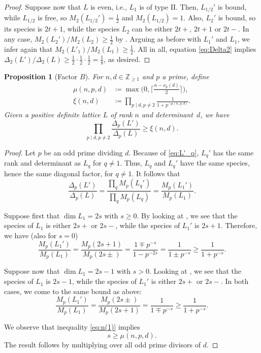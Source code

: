 \documentclass[a4paper]{amsart}
\theoremstyle{definition}
\theoremstyle{plain}
\newtheorem{proposition}[definition]{Proposition}
\newcommand{\IZ}{\mathbb{Z}}
\newcommand{\II}{\mathrm{II}}
\begin{document}
\begin{proof}
    Suppose now that \(L\) is even, i.e., \(L_1\) is of type \(\II\). Then, \(L_{1/2}'\) is bound, while \(L_{1/2}\) is free, so \(M_2(L_{1/2}') = \frac 12\) and \(M_2(L_{1/2}) = 1\). Also, \(L_2'\) is bound, so its species is \(2t+1\), while the species \(L_2\) can be either \(2t+\), \(2t+1\) or \(2t-\). In any case, \(M_2(L_2')/M_2(L_2) \geq \frac 12 \) by . Arguing as before with \(L_1'\) and \(L_1\), we infer again that \(M_2(L'_1)/M_2(L_1) \geq \frac 12\). All in all, equation \eqref{eq:Delta2} implies \(\Delta_2(L')/\Delta_2(L) \geq \frac 12 \cdot \frac 12 \cdot \frac 12 = \frac 18\), as desired.
\end{proof}

\begin{proposition}[Factor \(B\)] \label{prop:factor.B}
    For \(n, d \in \IZ_{\geq 1}\) and \(p\) a prime, define
    \begin{align*}
    	\mu(n,p,d) & \coloneqq \max\Big(0, \Big\lceil \frac{n-\nu_p(d)}{2}\Big\rceil\Big), \\
        \xi(n, d) & \coloneqq \prod_{p \mid d, p \neq 2} \frac{1}{1 + p^{-\mu(n,p,d)}}.
    \end{align*} 
    Given a positive definite lattice \(L\) of rank \(n\) and determinant~\(d\), we have
    \[
        \prod_{p \mid d, p \neq 2} \frac{\Delta_p(L')}{\Delta_p(L)} \geq \xi(n, d).
    \]
\end{proposition}
\begin{proof}
    Let \(p\) be an odd prime dividing \(d\). Because of \eqref{eq:L'_q}, \(L_q'\) has the same rank and determinant as \(L_q\) for \(q \neq 1\). Thus, \(L_q\) and \(L_q'\) have the same species, hence the same diagonal factor, for \(q \neq 1\). It follows that
    \[
        \frac{\Delta_p(L')}{\Delta_p(L)} = \frac{\prod_q M_p(L_q')}{\prod_q M_p(L_q)} = \frac{M_p(L_1')}{M_p(L_1)}.
    \]
    
    Suppose first that \(\dim L_1 = 2s\) with \(s \geq 0\). By looking at \cite[Table~1]{ConwaySloane88}, we see that the species of \(L_1\) is either \(2s+\) or \(2s-\), while the species of \(L_1'\) is \(2s+1\). Therefore, we have (also for \(s = 0\))
    \[
        \frac{M_p(L_1')}{M_p(L_1)} = \frac{M_p(2s+1)}{M_p(2s\pm)} = \frac{1 \mp p^{-s}}{1 - p^{-2s}} = \frac{1}{1 \pm p^{-s}} \geq \frac{1}{1 + p^{-s}}.
    \]

    Suppose now that \(\dim L_1 = 2s-1\) with \(s > 0\). Looking at \cite[Table~1]{ConwaySloane88}, we see that the species of \(L_1\) is \(2s-1\), while the species of \(L_1'\) is either \(2s+\) or \(2s-\). In both cases, we come to the same bound as above:
    \[
        \frac{M_p(L_1')}{M_p(L_1)} = \frac{M_p(2s\pm)}{M_p(2s+1)} = \frac{1}{1 \mp p^{-s}} \geq \frac{1}{1 + p^{-s}}.
    \]
    
    We observe that inequality \eqref{eq:n(1)} implies
    \[
        s \geq \mu(n,p,d).
    \]
    The result follows by multiplying over all odd prime divisors of \(d\).
\end{proof}
\end{document}
